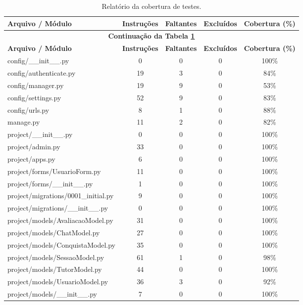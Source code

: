 \begin{landscape}
    \setlength{\oddsidemargin}{\evensidemargin}
    \iniciarCabecalhoTabelaPaisagem
\begin{longtable}{lcccc}
\caption{Relatório da cobertura de testes.\label{tab:coverageUnit}} \\
\toprule
\textbf{Arquivo / Módulo} & \textbf{Instruções} & \textbf{Faltantes} & \textbf{Excluídos} & \textbf{Cobertura (\%)} \\
\midrule
\endfirsthead
\multicolumn{5}{c}{{\bfseries Continuação da Tabela \ref{tab:coverageUnit}}} \\
\toprule
\textbf{Arquivo / Módulo} & \textbf{Instruções} & \textbf{Faltantes} & \textbf{Excluídos} & \textbf{Cobertura (\%)} \\
\midrule
\endhead
\bottomrule
\endfoot
    config/\_\_init\_\_.py & 0 & 0 & 0 & 100\% \\
    config/authenticate.py & 19 & 3 & 0 & 84\% \\
    config/manager.py & 19 & 9 & 0 & 53\% \\
    config/settings.py & 52 & 9 & 0 & 83\% \\
    config/urls.py & 8 & 1 & 0 & 88\% \\
    manage.py & 11 & 2 & 0 & 82\% \\
    project/\_\_init\_\_.py & 0 & 0 & 0 & 100\% \\
    project/admin.py & 33 & 0 & 0 & 100\% \\
    project/apps.py & 6 & 0 & 0 & 100\% \\
    project/forms/UsuarioForm.py & 11 & 0 & 0 & 100\% \\
    project/forms/\_\_init\_\_.py & 1 & 0 & 0 & 100\% \\
    project/migrations/0001\_initial.py & 9 & 0 & 0 & 100\% \\
    project/migrations/\_\_init\_\_.py & 0 & 0 & 0 & 100\% \\
    project/models/AvaliacaoModel.py & 31 & 0 & 0 & 100\% \\
    project/models/ChatModel.py & 27 & 0 & 0 & 100\% \\
    project/models/ConquistaModel.py & 35 & 0 & 0 & 100\% \\
    project/models/SessaoModel.py & 61 & 1 & 0 & 98\% \\
    project/models/TutorModel.py & 44 & 0 & 0 & 100\% \\
    project/models/UsuarioModel.py & 36 & 3 & 0 & 92\% \\
    project/models/\_\_init\_\_.py & 7 & 0 & 0 & 100\% \\

\end{longtable}
\end{landscape}
